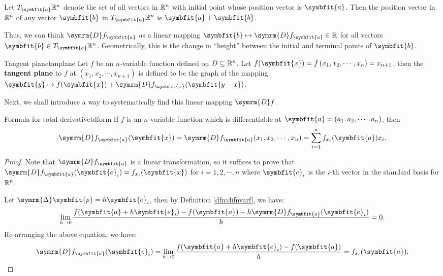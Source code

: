\documentclass[math]{amznotes}
\theoremstyle{remark}
\begin{document}
Let $T_{\symbfit{a}}\R^n$ denote the set of all vectors in $\mathbb{R}^n$ with initial point whose position vector is $\symbfit{a}$. Then the position vector in $\mathbb{R}^n$ of any vector $\symbfit{b}$ in $T_{\symbfit{a}}\R^n$ is $\symbfit{a} + \symbfit{b}$.

Thus, we can think $\symrm{D}f_{\symbfit{a}}$ as a linear mapping $\symbfit{b} \mapsto \symrm{D}f_{\symbfit{a}} \in \R$ for all vectors $\symbfit{b} \in T_{\symbfit{a}}\R^n$. Geometrically, this is the change in ``height'' between the initial and terminal points of $\symbfit{b}$.
\begin{dfnbox}{Tangent plane}{tanplane}
    Let $f$ be an $n$-variable function defined on $D \subseteq \mathbb{R}^n$. Let $f(\symbfit{x}) = f \left(x_1, x_2, \cdots, x_n\right) = x_{n + 1}$, then the {\color{red} \textbf{tangent plane}} to $f$ at $\left(x_1, x_2, \cdots, x_{n + 1}\right)$ is defined to be the graph of the mapping $\symbfit{y} \mapsto f(\symbfit{x}) + \symrm{D}f_{\symbfit{x}}(\symbfit{y - x})$.
\end{dfnbox}
Next, we shall introduce a way to systematically find this linear mapping $\symrm{D}f$.
\begin{thmbox}{Formula for total derivative}{tdform}
    If $f$ is an $n$-variable function which is differentiable at $\symbfit{a} = (a_1, a_2, \cdots, a_n)$, then
    \begin{equation*}
        \symrm{D}f_{\symbfit{a}}(\symbfit{x}) = \symrm{D}f_{\symbfit{a}}(x_1, x_2, \cdots, x_n) = \sum_{i = 1}^{n}f_{x_i}(\symbfit{a})x_i.
    \end{equation*}
    \tcblower
    \begin{proof}
        Note that $\symrm{D}f_{\symbfit{a}}$ is a linear transformation, so it suffices to prove that $\symrm{D}f_{\symbfit{a}}(\symbfit{e}_i) = f_{x_i}(\symbfit{x})$ for $i = 1, 2, \cdots, n$ where $\symbfit{e}_i$ is the $i$-th vector in the standard basis for $\mathbb{R}^n$.

        Let $\symrm{\Delta}\symbfit{p} = h\symbfit{e}_i$, then by Definition \ref{dfn:difnvarf}, we have:
        \begin{equation*}
            \lim_{h \to 0}\frac{f(\symbfit{a} + h \symbfit{e}_i) - f(\symbfit{a}) - h\symrm{D}f_{\symbfit{a}}(\symbfit{e}_i)}{h} = 0.
        \end{equation*}
        Re-arranging the above equation, we have:
        \begin{equation*}
            \symrm{D}f_{\symbfit{a}}(\symbfit{e}_i) = \lim_{h \to 0}\frac{f(\symbfit{a} + h \symbfit{e}_i) - f(\symbfit{a})}{h} = f_{x_i}(\symbfit{a}).
        \end{equation*}
    \end{proof}
\end{thmbox}
\end{document}
